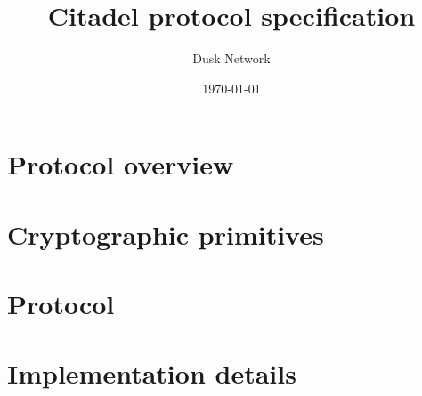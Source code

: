 \documentclass[draft]{article}
\title{Citadel protocol specification}
\author{Dusk Network}
\date{\today}
\begin{document}
	
\maketitle
\vspace{0.6cm}

\tableofcontents

\newpage

\section{Protocol overview}
\label{sec:general-overview}


\section{Cryptographic primitives}
\label{sec:crypto-primitives}


\section{Protocol}
\label{sec:protocol}


\section{Implementation details}
\label{sec:implementation}


%
%
%



\end{document}

